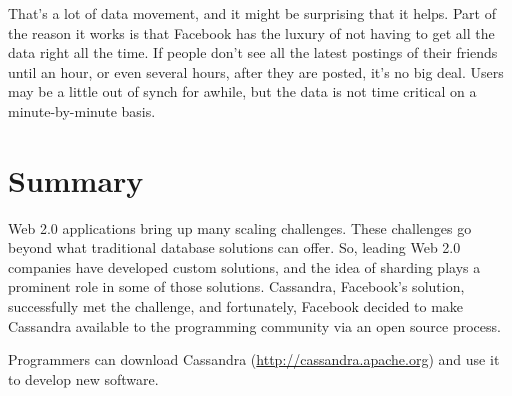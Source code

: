 That's a lot of data movement, and it might be surprising that it helps.
Part of the reason it works is that Facebook has the luxury of not having
to get all the data right all the time.
If people don't see all the latest postings of their friends until
an hour, or even several hours, after they are posted, it's no big deal.
Users may be a little out of synch for awhile, but the data is not time critical
on a minute-by-minute basis.

\section{Summary}

Web 2.0 applications bring up many scaling challenges.
These challenges go beyond what traditional database solutions can offer.
So, leading Web 2.0 companies have developed custom solutions,
and the idea of sharding plays a prominent role in some of those solutions.
Cassandra, Facebook's solution, successfully met the challenge, and
fortunately, Facebook decided to make Cassandra available to the
programming community via an open source process.

Programmers can download Cassandra (\url{http://cassandra.apache.org})
and use it to develop new software.

